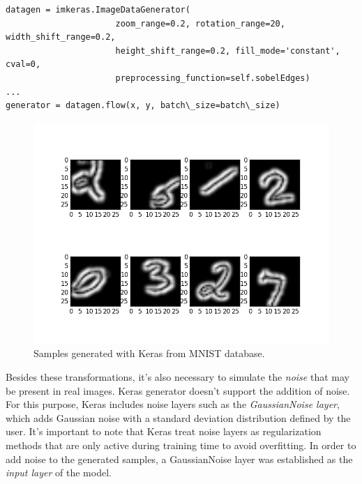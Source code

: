 \begin{lstlisting}
datagen = imkeras.ImageDataGenerator(
	                  zoom_range=0.2, rotation_range=20, width_shift_range=0.2, 
	                  height_shift_range=0.2, fill_mode='constant', cval=0,
	                  preprocessing_function=self.sobelEdges)
...	              
generator = datagen.flow(x, y, batch\_size=batch\_size)
\end{lstlisting}

\begin{figure}
	\centering
	\includegraphics[width=12cm, keepaspectratio]{figures/aug_keras.png}
	\caption{Samples generated with Keras from MNIST database.}
	\label{fig:aug_keras}
\end{figure}

Besides these transformations, it's also necessary to simulate the \emph{noise} that may be present in real images. Keras generator doesn't support the addition of noise. For this purpose, Keras includes noise layers such as the \emph{GaussianNoise layer}, which adds Gaussian noise with a standard deviation distribution defined by the user. It's important to note that Keras treat noise layers as regularization methods that are only active during training time to avoid overfitting. In order to add noise to the generated samples, a GaussianNoise layer was established as the \emph{input layer} of the model.

